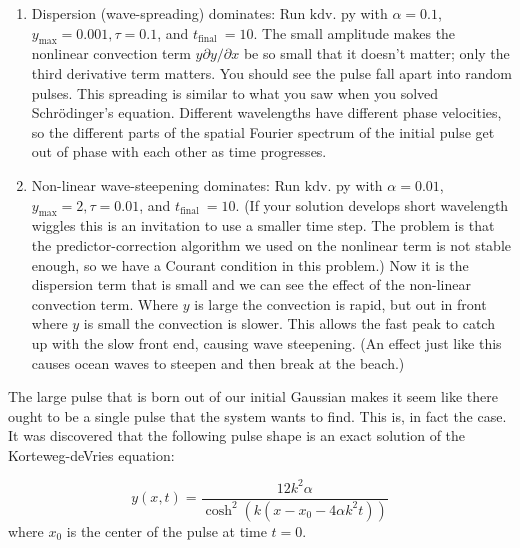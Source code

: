\begin{problem}\label{P12.4}
\begin{enumerate}[label=(\alph*)]

\item Dispersion (wave-spreading) dominates: Run $\mathrm{kdv}$. py with $\alpha=0.1$, $y_{\max }=0.001, \tau=0.1$, and $t_{\text {final }}=10$. The small amplitude makes the nonlinear convection term $y \partial y / \partial x$ be so small that it doesn't matter; only the third derivative term matters. You should see the pulse fall apart into random pulses. This spreading is similar to what you saw when you solved Schrödinger's equation. Different wavelengths have different phase velocities, so the different parts of the spatial Fourier spectrum of the initial pulse get out of phase with each other as time progresses.
\item Non-linear wave-steepening dominates: Run $\mathrm{kdv}$. py with $\alpha=0.01$, $y_{\max }=2, \tau=0.01$, and $t_{\text {final }}=10$. (If your solution develops short wavelength wiggles this is an invitation to use a smaller time step. The problem is that the predictor-correction algorithm we used on the nonlinear term is not stable enough, so we have a Courant condition in this problem.)
Now it is the dispersion term that is small and we can see the effect of the non-linear convection term. Where $y$ is large the convection is rapid, but out in front where $y$ is small the convection is slower. This allows the fast peak to catch up with the slow front end, causing wave steepening. (An effect just like this causes ocean waves to steepen and then break at the beach.)
\end{enumerate}
\end{problem}
The large pulse that is born out of our initial Gaussian makes it seem like
there ought to be a single pulse that the system wants to find. This is, in fact the
case. It was discovered that the following pulse shape is an exact solution of the
Korteweg-deVries equation:


\begin{equation}\label{eq:1214}
y(x, t)=\frac{12 k^{2} \alpha}{\cosh ^{2}\left(k\left(x-x_{0}-4 \alpha k^{2} t\right)\right)}
\end{equation}
where $x_0$ is the center of the pulse at time $t = 0$.


